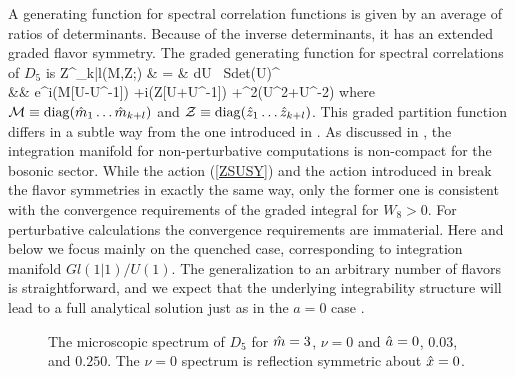 \documentclass[aps,prl,twocolumn,superscriptaddress,preprintnumbers,floatfix,nofootinbib]{revtex4}
\begin{document}
A generating function for spectral correlation functions is
given by an average of ratios of determinants. Because of 
the inverse determinants, it has an extended graded flavor
symmetry. The graded generating function for 
spectral correlations of $D_5$ is
\be
\label{ZSUSY}
Z^\nu_{k|l}({\cal M},{\cal Z};\ha)  & = & \int \hspace{-1.5mm} dU \
{\rm Sdet}(U)^\nu \\
&& \hspace{-2.5cm}\times 
  e^{i({\cal M}[U-U^{-1}])
    +i\frac{1}{2}{\Str}({\cal Z}[U+U^{-1}])
    +\ha^2{{\Str}(U^2+U^{-2})}} \nn 
\ee
where ${\cal M}\equiv{\rm diag}(\hat{m}_1\ldots \hat{m}_{k+l})$ and 
${\cal Z}\equiv{\rm diag}(\hat{z}_1\ldots \hat{z}_{k+l})$.
This graded partition function differs in a subtle way from the one 
introduced in \cite{Sharpe}. As discussed in \cite{DOTV}, the 
integration manifold for non-perturbative computations is
non-compact for the bosonic sector. 
While the action (\ref{ZSUSY}) and the action
introduced in \cite{Sharpe} break the flavor symmetries in
exactly the same way, only the former one is consistent with the
convergence requirements of the graded integral for $W_8>0$. 
For perturbative calculations the convergence requirements are immaterial.  
Here and below we focus mainly on the quenched case, corresponding
to integration manifold $Gl(1|1)/U(1)$. The generalization 
to an arbitrary number of flavors is straightforward,
and we expect that the underlying integrability structure will lead to 
a full analytical solution just as in the $a=0$ case \cite{SVtoda}.   


\begin{figure}[t!]
  \caption{ \label{fig:rho5nu0} The microscopic spectrum of $D_5$
    for $\hat{m}=3$, $\nu=0$ and $\hat{a}=0$, $0.03$, and $0.250$. The
  $\nu=0$ spectrum is reflection symmetric about $\hat{x}=0$.} 
  \vspace{-0mm}
\end{figure}
\end{document}
